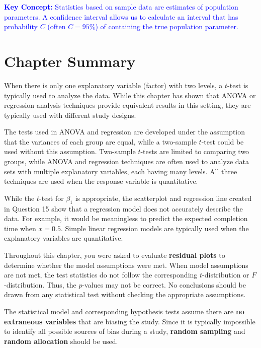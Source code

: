 \documentclass[
]{book}
\begin{document}
\textbf{\textcolor{blue}{Key Concept:}} \textcolor{blue}{Statistics based on sample data are estimates of population parameters. A confidence interval allows us to calculate an interval that has probability $C$ (often $C=95\%$) of containing the true population parameter.}

\hypertarget{chapter-summary-1}{%
\section{Chapter Summary}\label{chapter-summary-1}}

When there is only one explanatory variable (factor) with two levels, a \(t\)-test is typically used to analyze the data. While this chapter has shown that ANOVA or regression analysis techniques provide equivalent results in this setting, they are typically used with different study designs.

The tests used in ANOVA and regression are developed under the assumption that the variances of each group are equal, while a two-sample \(t\)-test could be used without this assumption. Two-sample \(t\)-tests are limited to comparing two groups, while ANOVA and regression techniques are often used to analyze data sets with multiple explanatory variables, each having many levels. All three techniques are used when the response variable is quantitative.

While the \(t\)-test for \(\beta_1\) is appropriate, the scatterplot and regression line created in Question 15 show that a regression model does not accurately describe the data. For example, it would be meaningless to predict the expected completion time when \(x = 0.5\). Simple linear regression models are typically used when the explanatory variables are quantitative.

Throughout this chapter, you were asked to evaluate \textbf{residual plots} to determine whether the model assumptions were met. When model assumptions are not met, the test statistics do not follow the corresponding \(t\)-distribution or \(F\)-distribution. Thus, the \(p\)-values may not be correct. No conclusions should be drawn from any statistical test without checking the appropriate assumptions.

The statistical model and corresponding hypothesis tests assume there are \textbf{no extraneous variables} that are biasing the study. Since it is typically impossible to identify all possible sources of bias during a study, \textbf{random sampling} and \textbf{random allocation} should be used.
\end{document}
